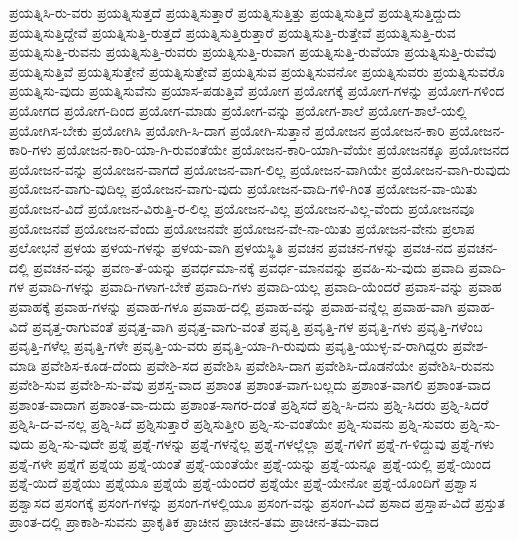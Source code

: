 {ಪ್ರಯತ್ನಿಸಿ-ರು-ವರು
ಪ್ರಯತ್ನಿಸುತ್ತದೆ
ಪ್ರಯತ್ನಿಸುತ್ತಾರೆ
ಪ್ರಯತ್ನಿಸುತ್ತಿತ್ತು
ಪ್ರಯತ್ನಿಸುತ್ತಿದೆ
ಪ್ರಯತ್ನಿಸುತ್ತಿದ್ದುದು
ಪ್ರಯತ್ನಿಸುತ್ತಿದ್ದೇವೆ
ಪ್ರಯತ್ನಿಸುತ್ತಿ-ರುತ್ತದೆ
ಪ್ರಯತ್ನಿಸುತ್ತಿರುತ್ತಾರೆ
ಪ್ರಯತ್ನಿಸುತ್ತಿ-ರುತ್ತೇವೆ
ಪ್ರಯತ್ನಿಸುತ್ತಿ-ರುವ
ಪ್ರಯತ್ನಿಸುತ್ತಿ-ರುವನು
ಪ್ರಯತ್ನಿಸುತ್ತಿ-ರುವರು
ಪ್ರಯತ್ನಿಸುತ್ತಿ-ರುವಾಗ
ಪ್ರಯತ್ನಿಸುತ್ತಿ-ರುವೆಯಾ
ಪ್ರಯತ್ನಿಸುತ್ತಿ-ರುವೆವು
ಪ್ರಯತ್ನಿಸುತ್ತಿವೆ
ಪ್ರಯತ್ನಿಸುತ್ತೇನೆ
ಪ್ರಯತ್ನಿಸುತ್ತೇವೆ
ಪ್ರಯತ್ನಿಸುವ
ಪ್ರಯತ್ನಿಸುವನೋ
ಪ್ರಯತ್ನಿಸುವರು
ಪ್ರಯತ್ನಿಸುವರೊ
ಪ್ರಯತ್ನಿಸು-ವುದು
ಪ್ರಯತ್ನಿಸುವೆನು
ಪ್ರಯಾಸ-ಪಡುತ್ತಿವೆ
ಪ್ರಯೋಗ
ಪ್ರಯೋಗಕ್ಕೆ
ಪ್ರಯೋಗ-ಗಳನ್ನು
ಪ್ರಯೋಗ-ಗಳಿಂದ
ಪ್ರಯೋಗದ
ಪ್ರಯೋಗ-ದಿಂದ
ಪ್ರಯೋಗ-ಮಾಡು
ಪ್ರಯೋಗ-ವನ್ನು
ಪ್ರಯೋಗ-ಶಾಲೆ
ಪ್ರಯೋಗ-ಶಾಲೆ-ಯಲ್ಲಿ
ಪ್ರಯೋಗಿಸ-ಬೇಕು
ಪ್ರಯೋಗಿಸಿ
ಪ್ರಯೋಗಿ-ಸಿ-ದಾಗ
ಪ್ರಯೋಗಿ-ಸುತ್ತಾನೆ
ಪ್ರಯೋಜನ
ಪ್ರಯೋಜನ-ಕಾರಿ
ಪ್ರಯೋಜನ-ಕಾರಿ-ಗಳು
ಪ್ರಯೋಜನ-ಕಾರಿ-ಯಾ-ಗಿ-ರುವಂತೆಯೇ
ಪ್ರಯೋಜನ-ಕಾರಿ-ಯಾಗಿ-ವೆಯೇ
ಪ್ರಯೋಜನಕ್ಕೂ
ಪ್ರಯೋಜನದ
ಪ್ರಯೋಜನ-ವನ್ನು
ಪ್ರಯೋಜನ-ವಾಗದೆ
ಪ್ರಯೋಜನ-ವಾಗ-ಲಿಲ್ಲ
ಪ್ರಯೋಜನ-ವಾಗಿಯೇ
ಪ್ರಯೋಜನ-ವಾಗಿ-ರುವುದು
ಪ್ರಯೋಜನ-ವಾಗು-ವುದಿಲ್ಲ
ಪ್ರಯೋಜನ-ವಾಗು-ವುದು
ಪ್ರಯೋಜನ-ವಾದಿ-ಗಳಿ-ಗಿಂತ
ಪ್ರಯೋಜನ-ವಾ-ಯಿತು
ಪ್ರಯೋಜನ-ವಿದೆ
ಪ್ರಯೋಜನ-ವಿರುತ್ತಿ-ರ-ಲಿಲ್ಲ
ಪ್ರಯೋಜನ-ವಿಲ್ಲ
ಪ್ರಯೋಜನ-ವಿಲ್ಲ-ವೆಂದು
ಪ್ರಯೋಜನವೂ
ಪ್ರಯೋಜನವೆ
ಪ್ರಯೋಜನ-ವೆಂದು
ಪ್ರಯೋಜನವೇ
ಪ್ರಯೋಜನ-ವೇ-ನಾ-ಯಿತು
ಪ್ರಯೋಜನ-ವೇನು
ಪ್ರಲಾಪ
ಪ್ರಲೋಭನೆ
ಪ್ರಳಯ
ಪ್ರಳಯ-ಗಳನ್ನು
ಪ್ರಳಯ-ವಾಗಿ
ಪ್ರಳಯಸ್ಥಿತಿ
ಪ್ರವಚನ
ಪ್ರವಚನ-ಗಳನ್ನು
ಪ್ರವಚ-ನದ
ಪ್ರವಚನ-ದಲ್ಲಿ
ಪ್ರವಚನ-ವನ್ನು
ಪ್ರವಣ-ತೆ-ಯನ್ನು
ಪ್ರವರ್ಧಮಾ-ನಕ್ಕೆ
ಪ್ರವರ್ಧ-ಮಾನವನ್ನು
ಪ್ರವಹಿ-ಸು-ವುದು
ಪ್ರವಾದಿ
ಪ್ರವಾದಿ-ಗಳ
ಪ್ರವಾದಿ-ಗಳನ್ನು
ಪ್ರವಾದಿ-ಗಳಾಗ-ಬೇಕೆ
ಪ್ರವಾದಿ-ಗಳು
ಪ್ರವಾದಿ-ಯಲ್ಲ
ಪ್ರವಾದಿ-ಯೆಂದರೆ
ಪ್ರವಾಸ-ವನ್ನು
ಪ್ರವಾಹ
ಪ್ರವಾಹಕ್ಕೆ
ಪ್ರವಾಹ-ಗಳನ್ನು
ಪ್ರವಾಹ-ಗಳೂ
ಪ್ರವಾಹ-ದಲ್ಲಿ
ಪ್ರವಾಹ-ವನ್ನು
ಪ್ರವಾಹ-ವನ್ನೆಲ್ಲ
ಪ್ರವಾಹ-ವಾಗಿ
ಪ್ರವಾಹ-ವಿದೆ
ಪ್ರವೃತ್ತ-ರಾಗುವಂತೆ
ಪ್ರವೃತ್ತ-ವಾಗಿ
ಪ್ರವೃತ್ತ-ವಾಗು-ವಂತೆ
ಪ್ರವೃತ್ತಿ
ಪ್ರವೃತ್ತಿ-ಗಳ
ಪ್ರವೃತ್ತಿ-ಗಳು
ಪ್ರವೃತ್ತಿ-ಗಳೆಂಬ
ಪ್ರವೃತ್ತಿ-ಗಳೆಲ್ಲ
ಪ್ರವೃತ್ತಿ-ಗಳೇ
ಪ್ರವೃತ್ತಿ-ಯ-ವರು
ಪ್ರವೃತ್ತಿ-ಯಾ-ಗಿ-ರುವುದು
ಪ್ರವೃತ್ತಿ-ಯುಳ್ಳ-ವ-ರಾಗಿದ್ದರು
ಪ್ರವೇಶ-ಮಾಡಿ
ಪ್ರವೇಶಿಸ-ಕೂಡ-ದೆಂದು
ಪ್ರವೇಶಿ-ಸದ
ಪ್ರವೇಶಿಸಿ
ಪ್ರವೇಶಿಸಿ-ದಾಗ
ಪ್ರವೇಶಿಸಿ-ದೊಡನೆಯೇ
ಪ್ರವೇಶಿಸಿ-ರುವನು
ಪ್ರವೇಶಿ-ಸುವ
ಪ್ರವೇಶಿ-ಸು-ವೆವು
ಪ್ರಶಸ್ತ-ವಾದ
ಪ್ರಶಾಂತ
ಪ್ರಶಾಂತ-ವಾಗ-ಬಲ್ಲದು
ಪ್ರಶಾಂತ-ವಾಗಲಿ
ಪ್ರಶಾಂತ-ವಾದ
ಪ್ರಶಾಂತ-ವಾದಾಗ
ಪ್ರಶಾಂತ-ವಾ-ದುದು
ಪ್ರಶಾಂತ-ಸಾಗರ-ದಂತೆ
ಪ್ರಶ್ನಿಸದೆ
ಪ್ರಶ್ನಿ-ಸಿ-ದನು
ಪ್ರಶ್ನಿ-ಸಿದರು
ಪ್ರಶ್ನಿ-ಸಿದರೆ
ಪ್ರಶ್ನಿಸಿ-ದ-ವ-ನಲ್ಲ
ಪ್ರಶ್ನಿ-ಸಿದೆ
ಪ್ರಶ್ನಿಸುತ್ತಾರೆ
ಪ್ರಶ್ನಿಸುತ್ತೀರಿ
ಪ್ರಶ್ನಿ-ಸು-ವಂತೆಯೇ
ಪ್ರಶ್ನಿ-ಸುವನು
ಪ್ರಶ್ನಿ-ಸುವರು
ಪ್ರಶ್ನಿ-ಸು-ವುದು
ಪ್ರಶ್ನಿ-ಸು-ವುದೇ
ಪ್ರಶ್ನೆ
ಪ್ರಶ್ನೆ-ಗಳನ್ನು
ಪ್ರಶ್ನೆ-ಗಳನ್ನೆಲ್ಲ
ಪ್ರಶ್ನೆ-ಗಳಲ್ಲೆಲ್ಲಾ
ಪ್ರಶ್ನೆ-ಗಳಿಗೆ
ಪ್ರಶ್ನೆ-ಗ-ಳಿದ್ದುವು
ಪ್ರಶ್ನೆ-ಗಳು
ಪ್ರಶ್ನೆ-ಗಳೇ
ಪ್ರಶ್ನೆಗೆ
ಪ್ರಶ್ನೆಯ
ಪ್ರಶ್ನೆ-ಯಂತೆ
ಪ್ರಶ್ನೆ-ಯಂತೆಯೇ
ಪ್ರಶ್ನೆ-ಯನ್ನು
ಪ್ರಶ್ನೆ-ಯನ್ನೂ
ಪ್ರಶ್ನೆ-ಯಲ್ಲಿ
ಪ್ರಶ್ನೆ-ಯಿಂದ
ಪ್ರಶ್ನೆ-ಯಿದೆ
ಪ್ರಶ್ನೆಯು
ಪ್ರಶ್ನೆಯೂ
ಪ್ರಶ್ನೆಯೆ
ಪ್ರಶ್ನೆ-ಯೆಂದರೆ
ಪ್ರಶ್ನೆಯೇ
ಪ್ರಶ್ನೆ-ಯೇನೋ
ಪ್ರಶ್ನೆ-ಯೊಂದಿಗೆ
ಪ್ರಶ್ವಾಸ
ಪ್ರಶ್ವಾಸದ
ಪ್ರಸಂಗಕ್ಕೆ
ಪ್ರಸಂಗ-ಗಳನ್ನು
ಪ್ರಸಂಗ-ಗಳಲ್ಲಿಯೂ
ಪ್ರಸಂಗ-ವನ್ನು
ಪ್ರಸಂಗ-ವಿದೆ
ಪ್ರಸಾದ
ಪ್ರಸ್ತಾಪ-ವಿದೆ
ಪ್ರಸ್ತುತ
ಪ್ರಾಂತ-ದಲ್ಲಿ
ಪ್ರಾಕಾಶಿ-ಸುವನು
ಪ್ರಾಕೃತಿಕ
ಪ್ರಾಚೀನ
ಪ್ರಾಚೀನ-ತಮ
ಪ್ರಾಚೀನ-ತಮ-ವಾದ
}
